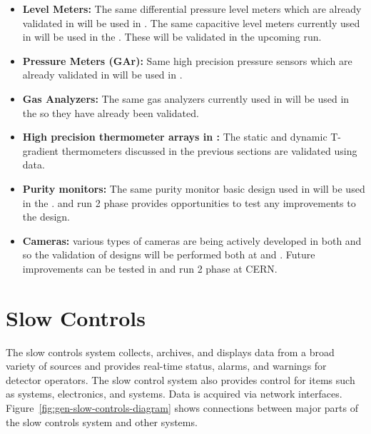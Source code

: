 \begin{itemize}
	\item {\bf Level Meters:} The same differential pressure level meters
	      which are already validated in  will be used in . The same capacitive level meters currently used in
	       will be used in the . These will be
	      validated in the upcoming  run.
	\item {\bf Pressure Meters (GAr):} Same high precision pressure sensors which are already validated in  will be used in  .
	\item {\bf Gas Analyzers:} The same gas analyzers currently used in
	       will be used in the  so they have already
	      been validated.
	\item {\bf High precision thermometer arrays in :} The static
	      and dynamic T-gradient thermometers discussed in the previous sections are validated using  data.
	\item {\bf Purity monitors:} The same purity monitor basic design used in  will be used in the  .  and  run 2 phase provides opportunities to
	      test any improvements to the design.
	\item {\bf Cameras:} various types of cameras are being actively
	      developed in both  and  so the validation of
	      designs will be performed both at  and . Future
	      improvements can be tested in  and  run 2 phase
	      at CERN.
\end{itemize}


\section{Slow Controls}

The slow controls system collects, archives, and displays data from
a broad variety of sources and provides real-time status, alarms, and warnings for detector operators. The slow control system also provides control for %
items such as  systems,  electronics, and  systems. Data is acquired via network interfaces.  Figure~\ref{fig:gen-slow-controls-diagram} shows connections between major parts of the slow controls system and other systems. %


